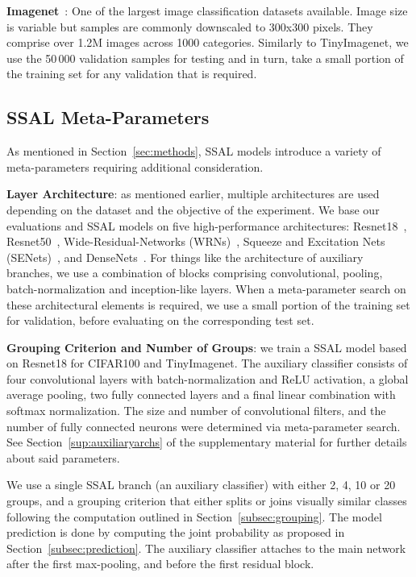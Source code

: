 \documentclass[10pt,twocolumn,letterpaper]{article}
\begin{document}
\textbf{Imagenet}~\cite{russakovsky2015imagenet}: One of the largest image classification datasets available.
Image size is variable but samples are commonly downscaled to 300x300 pixels.
They comprise over 1.2M images across 1000 categories.
Similarly to TinyImagenet, we use the 50\,000 validation samples for testing and in turn, take a small portion of the training set for any validation that is required.

\subsection{SSAL Meta-Parameters}
As mentioned in Section~\ref{sec:methods}, SSAL models introduce a variety of meta-parameters requiring additional consideration.

\textbf{Layer Architecture}: as mentioned earlier, multiple architectures are used depending on the dataset and the objective of the experiment.
We base our evaluations and SSAL models on five high-performance architectures: Resnet18~\cite{he2016deep}, Resnet50~\cite{he2016deep}, Wide-Residual-Networks (WRNs)~\cite{zagoruyko2016wide}, Squeeze and Excitation Nets (SENets)~\cite{hu2018squeeze}, and DenseNets~\cite{huang2017densely}.
For things like the architecture of auxiliary branches, we use a combination of blocks comprising convolutional, pooling, batch-normalization and inception-like layers.
When a meta-parameter search on these architectural elements is required, we use a small portion of the training set for validation, before evaluating on the corresponding test set.

\textbf{Grouping Criterion and Number of Groups}: we train a SSAL model based on Resnet18 for CIFAR100 and TinyImagenet.
The auxiliary classifier consists of four convolutional layers with batch-normalization and ReLU activation, a global average pooling, two fully connected layers and a final linear combination with softmax normalization.
The size and number of convolutional filters, and the number of fully connected neurons were determined via meta-parameter search.
See Section~\ref{sup:auxiliaryarchs} of the supplementary material for further details about said parameters.

We use a single SSAL branch (\ie an auxiliary classifier) with either 2, 4, 10 or 20 groups, and a grouping criterion that either splits or joins visually similar classes following the computation outlined in Section~\ref{subsec:grouping}.
The model prediction is done by computing the joint probability as proposed in Section~\ref{subsec:prediction}.
The auxiliary classifier attaches to the main network after the first max-pooling, and before the first residual block.
\end{document}
